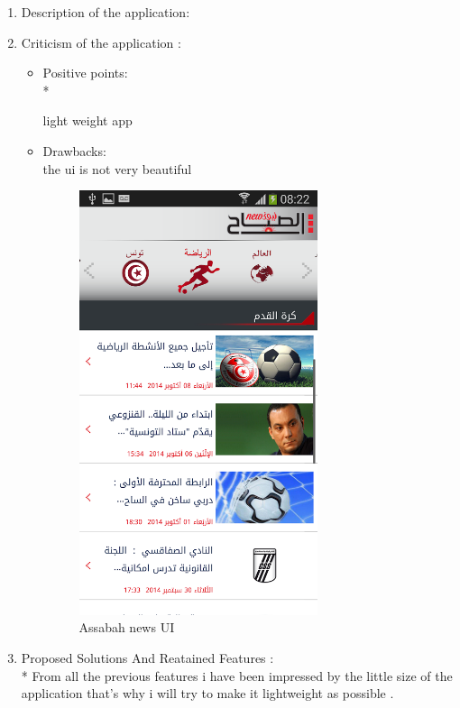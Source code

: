 \begin{enumerate}
  \item Description of the application:

  \item Criticism of the application :
  
\begin{itemize}
\item Positive points:
\\* 

light weight app
 
  
  
 \item Drawbacks: 
\\the ui is not very beautiful

\begin{figure}[H]
	\includegraphics[width=7cm]{assabah_news.png}
	\caption{Assabah news UI }
	\centering
	\label{imag3}
\end{figure}
  
\end{itemize}  
\item Proposed Solutions And Reatained Features :
\\* 
From all the previous features i have been impressed by the little size of the application that's why i will try to make it lightweight as possible .

\end{enumerate}

